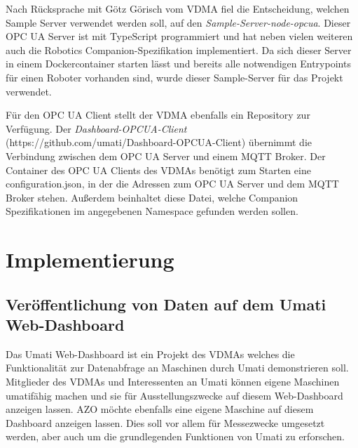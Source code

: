 \documentclass[a4paper, 12pt, oneside, toc=listofnumbered, bibliography=totoc]{scrbook}
\begin{document}
		Nach Rücksprache mit Götz Görisch vom VDMA fiel die Entscheidung, welchen Sample Server verwendet werden soll, auf den \textit{Sample-Server-node-opcua}. Dieser OPC UA Server ist mit TypeScript programmiert und hat neben vielen weiteren auch die Robotics Companion-Spezifikation implementiert. Da sich dieser Server in einem Dockercontainer starten lässt und bereits alle notwendigen Entrypoints für einen Roboter vorhanden sind, wurde dieser Sample-Server für das Projekt verwendet.
		
		Für den OPC UA Client stellt der VDMA ebenfalls ein Repository zur Verfügung. Der \textit{Dashboard-OPCUA-Client} (https://github.com/umati/Dashboard-OPCUA-Client) übernimmt die Verbindung zwischen dem OPC UA Server und einem MQTT Broker. Der Container des OPC UA Clients des VDMAs benötigt zum Starten eine configuration.json, in der die Adressen zum OPC UA Server und dem MQTT Broker stehen. Außerdem beinhaltet diese Datei, welche Companion Spezifikationen im angegebenen Namespace gefunden werden sollen. 
		
	
		
	
\chapter{Implementierung}\label{ch:Implementierung}
	
	\section{Veröffentlichung von Daten auf dem Umati Web-Dashboard}\label{ch:Implementierung-Web}
		
		Das Umati Web-Dashboard ist ein Projekt des VDMAs welches die Funktionalität zur Datenabfrage an Maschinen durch Umati demonstrieren soll. Mitglieder des VDMAs und Interessenten an Umati können eigene Maschinen umatifähig machen und sie für Ausstellungszwecke auf diesem Web-Dashboard anzeigen lassen. AZO möchte ebenfalls eine eigene Maschine auf diesem Dashboard anzeigen lassen. Dies soll vor allem für Messezwecke umgesetzt werden, aber auch um die grundlegenden Funktionen von Umati zu erforschen.
		
\end{document}
